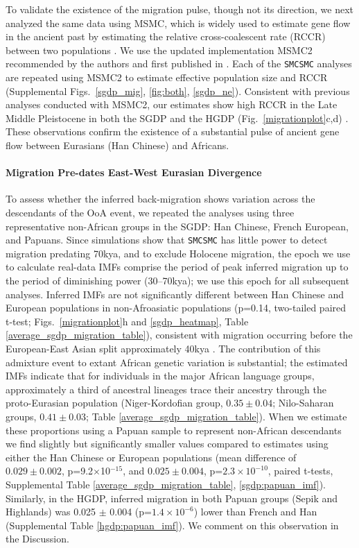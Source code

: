 To validate the existence of the migration pulse, though not its direction, we next analyzed the same data using MSMC, which is widely used to estimate gene flow in the ancient past by estimating the relative cross-coalescent rate (RCCR) between two populations \cite{Schiffels2014,Fan2019, Pagani2015, Raghavan2015}. We use the updated implementation MSMC2 recommended by the authors and first published in \cite{Malaspinas2016}. Each of the {\tt SMCSMC} analyses are repeated using MSMC2 to estimate effective population size and RCCR (Supplemental Figs.\ \ref{sgdp_mig}, \ref{fig:both}, \ref{sgdp_ne}). Consistent with previous analyses conducted with MSMC2, our estimates show high RCCR in the Late Middle Pleistocene in both the SGDP and the HGDP (Fig.\ \ref{migrationplot}c,d) \cite{Fan2019, Bergstrom2019}. These observations confirm the existence of a substantial pulse of ancient gene flow between Eurasians (Han Chinese) and Africans.

\paragraph{Migration Pre-dates East-West Eurasian Divergence}

To assess whether the inferred back-migration shows variation across the descendants of the OoA event, we repeated the analyses using three representative non-African groups in the SGDP: Han Chinese, French European, and Papuans.  Since simulations show that {\tt SMCSMC} has little power to detect migration predating 70kya, and to exclude Holocene migration, the epoch we use to calculate real-data IMFs comprise the period of peak inferred migration up to the period of diminishing power (30--70kya); we use this epoch for all subsequent analyses. Inferred IMFs are not significantly different between Han Chinese and European populations in non-Afroasiatic populations (p=0.14, two-tailed paired t-test; Figs.\ \ref{migrationplot}h and \ref{sgdp_heatmap}, Table \ref{average_sgdp_migration_table}), consistent with migration occurring before the European-East Asian split approximately 40kya \cite{Mathieson2014}.  The contribution of this admixture event to extant African genetic variation is substantial; the estimated IMFs indicate that for individuals in the major African language groups, approximately a third of ancestral lineages trace their ancestry through the proto-Eurasian population (Niger-Kordofian group, $0.35\pm 0.04$; Nilo-Saharan groups, $0.41\pm 0.03$; Table \ref{average_sgdp_migration_table}). When we estimate these proportions using a Papuan sample to represent non-African descendants we find slightly but significantly smaller values compared to estimates using either the Han Chinese or European populations (mean difference of $0.029 \pm 0.002$, p=9.2$\times$10$^{-15}$, and $0.025 \pm 0.004$, p=$2.3\times 10^{-10}$, paired t-tests, Supplemental Table \ref{average_sgdp_migration_table}, \ref{sgdp:papuan_imf}). Similarly, in the HGDP, inferred migration in both Papuan groups (Sepik and Highlands) was 0.025 $\pm$ 0.004 (p=$1.4\times10^{-6}$) lower than French and Han (Supplemental Table \ref{hgdp:papuan_imf}).  We comment on this observation in the Discussion. 


